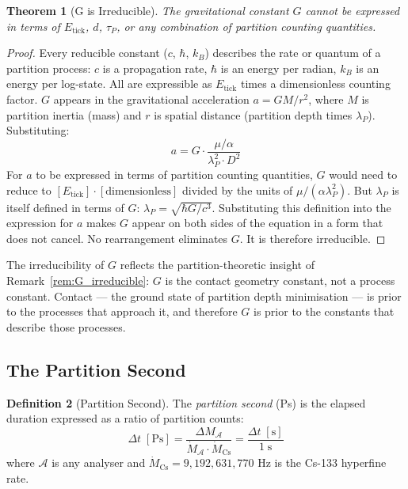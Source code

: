 \documentclass[11pt,twocolumn,a4paper]{article}
\theoremstyle{plain}
\newtheorem{theorem}{Theorem}[section]
\theoremstyle{definition}
\newtheorem{definition}[theorem]{Definition}
\theoremstyle{remark}
\begin{document}
\begin{theorem}[G is Irreducible]
\label{thm:G_irreducible}
The gravitational constant $G$ cannot be expressed in terms of $E_{\mathrm{tick}}$,
$d$, $\tau_P$, or any combination of partition counting quantities.
\end{theorem}

\begin{proof}
Every reducible constant ($c$, $\hbar$, $k_B$) describes the rate or quantum of
a partition process: $c$ is a propagation rate, $\hbar$ is an energy per radian,
$k_B$ is an energy per log-state. All are expressible as $E_{\mathrm{tick}}$
times a dimensionless counting factor. $G$ appears in the gravitational
acceleration $a = GM/r^2$, where $M$ is partition inertia (mass) and $r$ is
spatial distance (partition depth times $\lambda_P$). Substituting:
\begin{equation}
    a = G \cdot \frac{\mu/\alpha}{\lambda_P^2 \cdot D^2}
\end{equation}
For $a$ to be expressed in terms of partition counting quantities, $G$ would
need to reduce to $[E_{\mathrm{tick}}] \cdot [\mathrm{dimensionless}]$ divided
by the units of $\mu/(\alpha \lambda_P^2)$. But $\lambda_P$ is itself defined in
terms of $G$: $\lambda_P = \sqrt{\hbar G/c^3}$. Substituting this definition
into the expression for $a$ makes $G$ appear on both sides of the equation in a
form that does not cancel. No rearrangement eliminates $G$. It is therefore
irreducible.
\end{proof}

The irreducibility of $G$ reflects the partition-theoretic insight of
Remark~\ref{rem:G_irreducible}: $G$ is the contact geometry constant, not a
process constant. Contact --- the ground state of partition depth minimisation
--- is prior to the processes that approach it, and therefore $G$ is prior to
the constants that describe those processes.

\subsection{The Partition Second}
\label{subsec:partition_second}

\begin{definition}[Partition Second]
\label{def:partition_second}
The \emph{partition second} (Ps) is the elapsed duration expressed as a ratio
of partition counts:
\begin{equation}
    \Delta t \;[\mathrm{Ps}] = \frac{\Delta M_{\mathcal{A}}}{\dot{M}_{\mathcal{A}}
    \cdot \dot{M}_{\mathrm{Cs}}} = \frac{\Delta t \;[\mathrm{s}]}{1\;\mathrm{s}}
    \label{eq:partition_second}
\end{equation}
where $\mathcal{A}$ is any analyser and $\dot{M}_{\mathrm{Cs}} = 9{,}192{,}631{,}770$
Hz is the Cs-133 hyperfine rate.
\end{definition}
\end{document}
